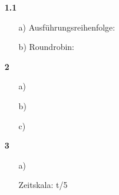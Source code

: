\documentclass[a4paper,11pt]{article}
\author{\authorinfo}
\title{\titleinfo}
\date{\today}
\begin{document}
\maketitle


\begin{enumerate}
\item[\textbf{1.1}]

\begin{itemize}
    \item[a)] Ausführungsreihenfolge:
    \begin{figure}[h]
        \scalebox{0.5}{}
    \end{figure}
    \item[b)] Roundrobin:
    \begin{figure}[h]
        \scalebox{0.5}{}
    \end{figure}
\end{itemize}

\item[\textbf{2}]

\begin{itemize}
    \item[a)]

    \item[b)]

    \item[c)] 
\end{itemize}

\item[\textbf{3}]

\begin{itemize}
    \item[a)]

    Zeitskala: t/5

    \begin{blockgraph}{34}{5}{0.4} %







\end{blockgraph}
\end{itemize}
\end{enumerate}
\end{document}
